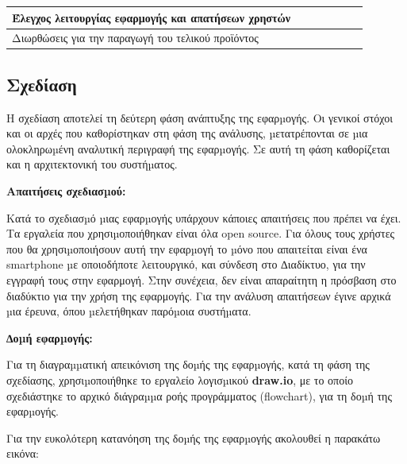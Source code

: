\documentclass[a4paper,12pt]{article}
\begin{document}
\begin{table}[htb]
{{\begin{tabular}{|l|l|l|l|l|l|l|}
			Έλεγχος λειτουργίας εφαρμογής και απατήσεων χρηστών &                          &                          &                          &                          &                          & \cellcolor[HTML]{D14A47} \\ \hline
			Διωρθώσεις για την παραγωγή του τελικού προϊόντος   &                          &                          &                          &                          &                          & \cellcolor[HTML]{D14A47} \\ \hline
			\end{tabular}%
			}
			}
		\end{table}
		\newpage
		\subsection{Σχεδίαση}
		Η σχεδίαση αποτελεί τη δεύτερη φάση ανάπτυξης της εφαρµογής. Οι
		γενικοί στόχοι και οι αρχές που καθορίστηκαν στη φάση της ανάλυσης, µετατρέπονται
		σε µια ολοκληρωµένη αναλυτική περιγραφή της εφαρµογής. Σε αυτή τη φάση
		καθορίζεται και η αρχιτεκτονική του συστήµατος.

		\textbf{Απαιτήσεις σχεδιασµού:}

		Κατά το σχεδιασµό µιας εφαρµογής υπάρχουν κάποιες απαιτήσεις που πρέπει να
		έχει. Τα εργαλεία που χρησιµοποιήθηκαν είναι όλα open source. Για όλους τους
		χρήστες που θα χρησιµοποιήσουν αυτή την εφαρµογή το µόνο που απαιτείται είναι
		ένα smartphone µε οποιοδήποτε λειτουργικό, και σύνδεση στο ∆ιαδίκτυο, για την 
		εγγραφή τους στην εφαρμογή. Στην συνέχεια, δεν είναι απαραίτητη η πρόσβαση στο
		διαδύκτιο για την χρήση της εφαρμογής. 
		Για την ανάλυση απαιτήσεων έγινε αρχικά µια
		έρευνα, όπου µελετήθηκαν παρόµοια συστήµατα.

		\textbf{∆οµή εφαρµογής:}

 		Για τη διαγραµµατική απεικόνιση της δοµής της εφαρµογής, κατά τη φάση της
		σχεδίασης, χρησιµοποιήθηκε το εργαλείο λογισµικού \textbf{draw.io}, με το οποίο
		σχεδιάστηκε το αρχικό διάγραµµα ροής προγράμματος (flowchart), για τη δοµή της εφαρµογής. 
		
		Για την ευκολότερη κατανόηση της δοµής της εφαρµογής ακολουθεί η παρακάτω εικόνα:
\end{document}
